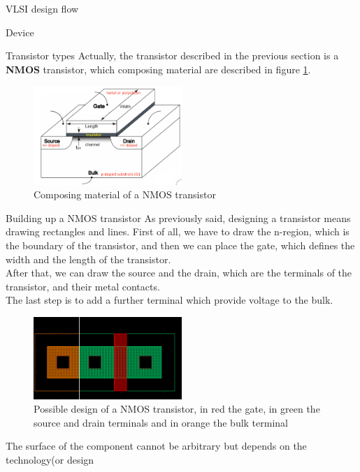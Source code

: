 \begin{section}{VLSI design flow}
\begin{subsection}{Device}
  \end{subsection}
  \begin{subsection}{Transistor types}
    Actually, the transistor described in the previous section is a \textbf{NMOS} transistor, which
    composing material are described in figure \ref{fig:nmos transistor}.
    \begin{figure}[h]
      \centering
      \includegraphics[width=0.5\textwidth]{img/hardware/nmos tranistor.png}
      \caption{Composing material of a NMOS transistor}
      \label{fig:nmos transistor}
    \end{figure}
    \begin{subsubsection}{Building up a NMOS transistor}
      As previously said, designing a transistor means drawing rectangles and lines.
      First of all, we have to draw the n-region, which is the boundary of the transistor, and then
      we can place the gate, which defines the width and the length of the transistor.\\
      After that, we can draw the source and the drain, which are the terminals of the transistor, 
      and their metal contacts.\\
      The last step is to add a further terminal which provide voltage to the bulk.
      \begin{figure}[h]
        \centering
        \includegraphics[width=0.5\textwidth]{img/hardware/nmos design.png}
        \caption{Possible design of a NMOS transistor, in red the gate, in green the source and drain
        terminals and in orange the bulk terminal}
        \label{fig:nmos transistor design}
      \end{figure}
      The surface of the component cannot be arbitrary but depends on the technology(or design 

\end{subsubsection}
\end{subsection}
\end{section}
